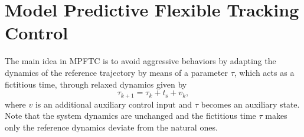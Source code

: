 \documentclass[journal]{IEEEtran}
\newcommand{\review}[1]{#1}
\begin{document}
	
	\section{Model Predictive Flexible Tracking Control}\label{sec:mpftc}
	The main idea in MPFTC is to avoid aggressive behaviors by adapting the \review{dynamics of the} reference trajectory by means of a parameter $\tau$, which acts as a fictitious time, through relaxed dynamics given by
	\begin{equation}
		\label{eq:tau_controlled}
		\tau_{k+1} = \tau_k + t_\mathrm{s} + v_k,
	\end{equation}
	where $v$ is an additional auxiliary control input and $\tau$ becomes an auxiliary state. \review{Note that the system dynamics are unchanged and the fictitious time $\tau$ makes only the reference dynamics deviate from the natural ones. 
	}

	
 	
 	
 	
 	
 	
 	
 	
 	
 	
 	
 	
 	
 	
 	 	
	
\end{document}

